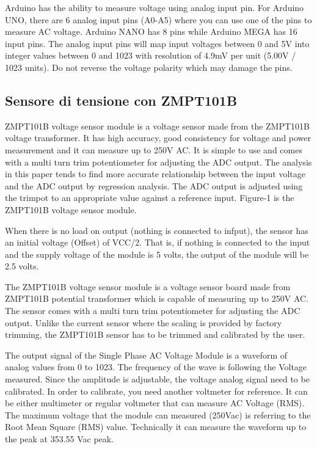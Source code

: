 \documentclass[italian,12pt,a4paper,oneside,final]{report}
\begin{document}
Arduino has the ability to measure voltage using analog input pin. For Arduino UNO, there are 6 analog input pins (A0-A5) where you can use one of the pins to measure AC voltage. Arduino NANO has 8 pins while Arduino MEGA has 16 input pins. The analog input pins will map input voltages between 0 and 5V into integer values between 0 and 1023 with resolution of 4.9mV per unit (5.00V / 1023 units). Do not reverse the voltage polarity which may damage the pins.


\subsection{Sensore di tensione con ZMPT101B}
ZMPT101B voltage sensor module is a voltage
sensor made from the ZMPT101B voltage transformer. It
has high accuracy, good consistency for voltage and power
measurement and it can measure up to 250V AC. It is
simple to use and comes with a multi turn trim
potentiometer for adjusting the ADC output. The analysis
in this paper tends to find more accurate relationship
between the input voltage and the ADC output by
regression analysis. The ADC output is adjusted using the
trimpot to an appropriate value against a reference input.
Figure-1 is the ZMPT101B voltage sensor module.


When there is no load on output (nothing is connected to infput), the sensor has an initial voltage (Offset) of VCC/2. That is, if nothing is connected to the input and the supply voltage of the module is 5 volts, the output of the module will be 2.5 volts. 

The ZMPT101B voltage sensor module is a
voltage sensor board made from ZMPT101B potential
transformer which is capable of measuring up to 250V
AC. The sensor comes with a multi turn trim
potentiometer for adjusting the ADC output. Unlike the
current sensor where the scaling is provided by factory
trimming, the ZMPT101B sensor has to be trimmed and
calibrated by the user.


The output signal of the Single Phase AC Voltage Module is a waveform of analog values from 0 to 1023. The frequency of the wave is following the Voltage measured. Since the amplitude is adjustable, the voltage analog signal need to be calibrated. In order to calibrate, you need another voltmeter for reference. It can be either multimeter or regular voltmeter that can measure AC Voltage (RMS). The maximum voltage that the module can measured (250Vac) is referring to the Root Mean Square (RMS) value. Technically it can measure the waveform up to the peak at 353.55 Vac peak. 
\end{document}
